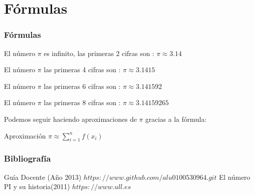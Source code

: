 \documentclass{beamer}
\begin{document}
\section {Fórmulas}
\begin{frame}
\frametitle{Fórmulas}
El número $\pi$ es infinito, las primeras 2 cifras son : $\pi \approx 3.14$

El número $\pi$ las primeras 4 cifras son : $\pi \approx 3.1415$

El número $\pi$ las primeras 6 cifras son : $\pi \approx 3.141592$

El número $\pi$ las primeras 8 cifras son : $\pi \approx 3.14159265$

Podemos seguir haciendo aproximaciones de $\pi$ gracias a la fórmula:
\begin{block}{Aproximación}
$\pi \approx \sum^{n}_{i=1} f(x_i)$
\end{block}
\end {frame}
\begin{frame} 
\frametitle{Bibliografía}
\begin{thebibliography}
\beamertermplatebookbibitems
{}
Guía Docente (Año 2013)
{\small $https://www.github.com/alu0100530964.git$}
 El n{\'u}mero PI y su historia(2011)
{\small $https://www.ull.es$}
\end{thebibliography}
\end {frame}
\end{document}
